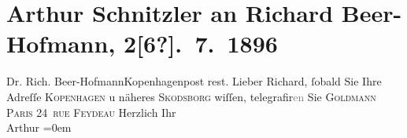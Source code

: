

         
         \renewcommand{\erwaehntePersonen}{Personen: Richard Beer-Hofmann, Paul Goldmann}
         \renewcommand{\erwaehnteOrte}{Orte: Kopenhagen, Oslo, Paris, Skodsborg, rue Feydeau}
         \renewcommand{\erwaehnteWerke}{}
               \section[Arthur Schnitzler an Richard Beer-Hofmann, 2{[}6?{]}. 7. 1896]{ Arthur Schnitzler an Richard Beer-Hofmann, 2{[}6?{]}. 7. 1896}\nopagebreak{}\rehead{ }\begin{ledgroupsized}[t]{13cm}\normalsize\beginnumbering \toendnotes[C]{\smallbreak\pagebreak[2]} 
\pstart{}{\pb}Dr.  Rich.
                  Beer-Hofmann\pend{}\pstart{}Kopenhagen\pend{}\pstart{}post rest.\pend{}{\bigskip}\pstart
           \noindent{}{\pb}Lieber Richard,{ }ſobald Sie Ihre Adreſſe \textsc{Kopenhagen} u näheres \textsc{Skodsborg} wiſſen, telegrafir\textcolor{gray}{en} Sie \textsc{Goldmann}{ }\textsc{Paris}{ }\textsc{24 rue Feydeau}\pend
           \pstart
           Herzlich Ihr{\\[\baselineskip]}\spacefill\mbox{Arthur}\pend
           \leftskip=0em{}
         
         \endnumbering{}\end{ledgroupsized}  \newcommand{\dateiname}{L00569}\newcommand{\titel}{Arthur Schnitzler an Richard Beer-Hofmann, 2[6?]. 7. 1896}\newcommand{\editorInnen}{Martin Anton Müller und Gerd-Hermann Susen}
      